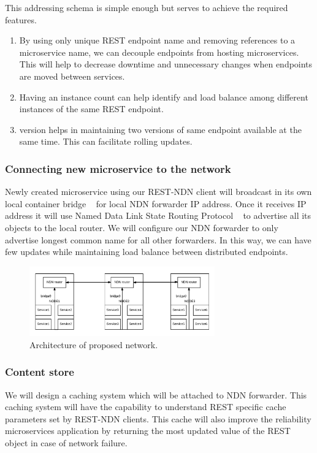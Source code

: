 This addressing schema is simple enough but serves to achieve the required features.
\begin{enumerate}
\item By using only unique REST endpoint name and removing references to a microservice name, we can decouple endpoints from hosting microservices. This will help to decrease downtime and unnecessary changes when endpoints are moved between services.
\item  Having an instance count can help identify and load balance among different instances of the same REST endpoint.
\item version helps in maintaining two versions of same endpoint available at the same time. This can facilitate rolling updates.  
\end{enumerate}


\subsubsection{Connecting new microservice to the network}

Newly created microservice using our REST-NDN client will broadcast in its own local container bridge ~\cite{DockerNet} for local NDN forwarder IP address. Once it receives IP address it will use Named Data Link State Routing Protocol ~\cite{hoque2013nlsr} to advertise all its objects to the local router. We will configure our NDN forwarder to only advertise longest common name for all other forwarders. In this way, we can have few updates while maintaining load balance between distributed endpoints.

\begin{figure}
   \includegraphics[height=3cm, width=8cm]{figs/structural_diagram}
   \caption{Architecture of proposed network.}
   \label{fig:networkmodel}
\end{figure}

\subsubsection{Content store}

We will design a caching system which will be attached to NDN forwarder. This caching system will have the capability to understand REST specific cache parameters set by REST-NDN clients. This cache will also improve the reliability microservices application by returning the most updated value of the REST object in case of network failure.

